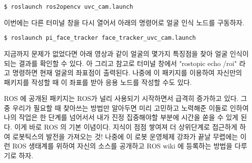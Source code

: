 \begin{lstlisting}[language=ROS]
$ roslaunch ros2opencv uvc_cam.launch
\end{lstlisting}

이번에는 다른 터미널 창을 다시 열어서 아래의 명령어로 얼굴 인식 노드를 구동하자.

\begin{lstlisting}[language=ROS]
$ roslaunch pi_face_tracker face_tracker_uvc_cam.launch
\end{lstlisting}

지금까지 문제가 없었다면 아래 영상과 같이 얼굴의 몇가지 특징점을 찾아 얼굴 인식이 되는 결과를 확인할 수 있다. 아 그리고 참고로 터미널 창에서 "rostopic echo /roi" 라고 명령하면 현재 얼굴의 좌표점이 출력된다. 나중에 이 패키지를 이용하여 자신만의 패키지를 작성할 때 이 좌표를 받아 응용 노드를 작성할 수도 있다.

ROS 에 공개된 패키지는 ROS가 널리 사용되기 시작하면서 급격히 증가하고 있다. 그 중 우리가 필요할 때 찾아쓰는 방법만 알아두면 미리 고민하고 노력해준 이들로 인하여 나의 작업은 한 단계를 넘어서서 내가 진정 집중해야할 부분에 시간을 쏟을 수 있게 된다. 이게 바로 ROS 의 기본 이념이다. 지식이 점점 쌓여져 더 상위단계로 접근하게 하여 로봇틱스의 발전을 가져오는 것! 나중에 이 로봇 운영체제 강좌가 끝날 무렵에는 이런 ROS 생태계를 위하여 자신의 소스를 공개하고 ROS wiki 에 등록하는 방법을 다루기로 하자.







